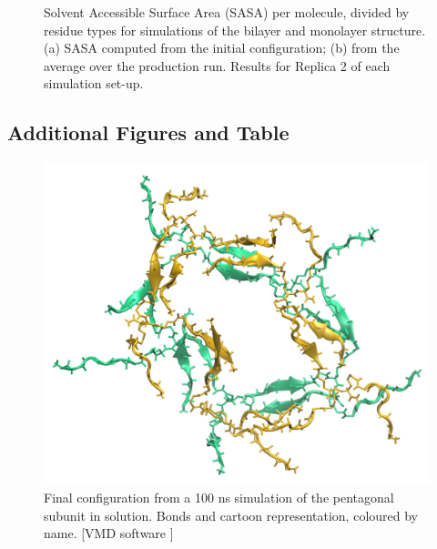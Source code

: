 \begin{figure}[t!]
\centering
{} 
\caption[(SI) Replica 2: SASA per residue of monolayer and bilater]{Solvent Accessible Surface Area (SASA) per molecule, divided by residue types for simulations of the bilayer and monolayer structure. (a) SASA computed from the initial configuration; (b) from the average over the production run. Results for Replica 2 of each simulation set-up.}
\label{fig:mono_bi_sasa2}
\end{figure}

\clearpage


\subsection{Additional Figures and Table}
\begin{figure}[h!]
\centering
\vspace{2.5cm}
\includegraphics[width=0.5\linewidth]{3results_capsule/pics/penta_final.png}
\caption[(SI) Pentagonal subunit atomistic simulation: final configuration]{Final configuration from a 100 ns simulation of the pentagonal subunit in solution. Bonds and cartoon representation, coloured by name. [VMD software \citet{HUMP96}]}
\label{fig:penta_results_SI}
\end{figure}

